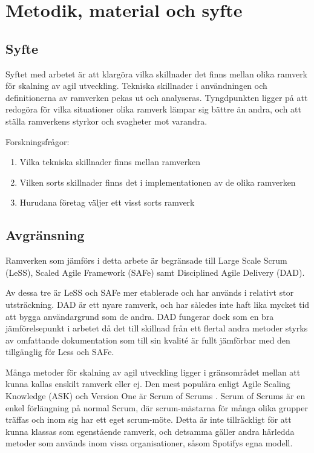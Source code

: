 	\newpage

\section{Metodik, material och syfte}
	
	
	\subsection{Syfte}
	
		Syftet med arbetet är att klargöra vilka skillnader det finns mellan olika ramverk för skalning av agil utveckling. Tekniska skillnader i användningen och definitionerna av ramverken pekas ut och analyseras.	Tyngdpunkten ligger på att redogöra för vilka situationer olika ramverk lämpar sig bättre än andra, och att ställa ramverkens styrkor och svagheter mot varandra. \newline
		
		Forskningsfrågor:
		\begin{enumerate}
			\item Vilka tekniska skillnader finns mellan ramverken
			\item Vilken sorts skillnader finns det i implementationen av de olika ramverken
			\item Hurudana företag väljer ett visst sorts ramverk
		\end{enumerate}
			
	
	\subsection{Avgränsning}
	
		Ramverken som jämförs i detta arbete är begränsade till Large Scale Scrum (LeSS), Scaled Agile Framework (SAFe) samt Disciplined Agile Delivery (DAD).
		
		Av dessa tre är LeSS och SAFe mer etablerade och har används i relativt stor utsträckning. DAD är ett nyare ramverk, och har således inte haft lika mycket tid att bygga användargrund som de andra. DAD fungerar dock som en bra jämförelsepunkt i arbetet då det till skillnad från ett flertal andra metoder styrks av omfattande dokumentation som till sin kvalité är fullt jämförbar med den tillgänglig för Less och SAFe.
		\cite{ask_matrix}
		
		Många metoder för skalning av agil utveckling ligger i gränsområdet mellan att kunna kallas enskilt ramverk eller ej. Den mest populära enligt Agile Scaling Knowledge (ASK) och Version One är Scrum of Scrums \cite{ask_matrix} \cite{version_one_report}. Scrum of Scrums är en enkel förlängning på normal Scrum, där scrum-mästarna för många olika grupper träffas och inom sig har ett eget scrum-möte. Detta är inte tillräckligt för att kunna klassas som egenstående ramverk, och detsamma gäller andra härledda metoder som används inom vissa organisationer, såsom Spotifys egna modell.
		
